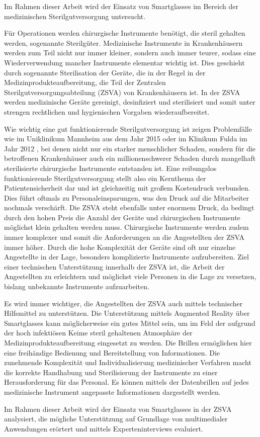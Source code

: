 Im Rahmen dieser Arbeit wird der Einsatz von Smartglasses im Bereich der medizinischen Sterilgutversorgung untersucht. 

Für Operationen werden chirurgische Instrumente benötigt, die steril gehalten werden, sogenannte Sterilgüter.
Medizinische Instrumente in Krankenhäusern werden zum Teil nicht nur immer kleiner, sondern auch immer teurer, sodass eine Wiederverwendung mancher Instrumente elementar wichtig ist. Dies geschieht durch sogenannte Sterilisation der Geräte, die in der Regel in der Medizinprodukteaufbereitung, die Teil der Zentralen Sterilgutversorgungsabteilung (ZSVA) von Krankenhäusern ist. In der ZSVA werden medizinische Geräte gereinigt, desinfiziert und sterilisiert und somit unter strengen rechtlichen und hygienischen Vorgaben wiederaufbereitet. 
%

Wie wichtig eine gut funktionierende Sterilgutversorgung ist zeigen Problemfälle wie im Uniklinikum Mannheim \cite{Brandt2015} aus dem Jahr 2015 oder im Klinikum Fulda im Jahr 2012 \cite{HygieneFuldar2012}, bei denen nicht nur ein starker menschlicher Schaden, sondern für die betroffenen Krankenhäuser auch ein millionenschwerer Schaden durch mangelhaft sterilisierte chirurgische Instrumente entstanden ist. Eine reibungslos funktionierende Sterilgutversorgung stellt also ein Kernthema der Patientensicherheit dar und ist gleichzeitig mit großem Kostendruck verbunden. Dies führt oftmals zu Personaleinsparungen, was den Druck auf die Mitarbeiter nochmals verschärft. Die ZSVA steht ebenfalls unter enormem Druck, da bedingt durch den hohen Preis die Anzahl der Geräte und chirurgischen Instrumente möglichst klein gehalten werden muss. Chirurgische Instrumente werden zudem immer komplexer und somit die Anforderungen an die Angestellten der ZSVA immer höher. Durch die hohe Komplexität der Geräte sind oft nur einzelne Angestellte in der Lage, besonders komplizierte Instrumente aufzubereiten. Ziel einer technischen Unterstützung innerhalb der ZSVA ist, die Arbeit der Angestellten zu erleichtern und möglichst viele Personen in die Lage zu versetzen, bislang unbekannte Instrumente aufzuarbeiten. 
%
%

Es wird immer wichtiger, die Angestellten der ZSVA auch mittels technischer Hilfsmittel zu unterstützen. Die Unterstützung mittels Augmented Reality über Smartglasses kann möglicherweise ein gutes Mittel sein, um im Feld der aufgrund der hoch infektiösen Keime steril gehaltenen Atmosphäre der Medizinprodukteaufbereitung eingesetzt zu werden. Die Brillen ermöglichen hier eine freihändige Bedienung und Bereitstellung von Informationen. Die zunehmende Komplexität und Individualisierung medizinischer Verfahren macht die korrekte Handhabung und Sterilisierung der Instrumente zu einer Herausforderung für das Personal. Es können mittels der Datenbrillen auf jedes medizinische Instrument angepasste Informationen dargestellt werden. 

Im Rahmen dieser Arbeit wird der Einsatz von Smartglasses in der ZSVA analysiert, die mögliche Unterstützung auf Grundlage von multimedialer Anwendungen erörtert und mittels Experteninterviews evaluiert. 